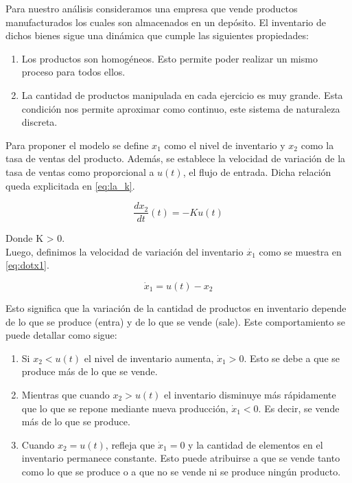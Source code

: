 \documentclass{sig-alternate}
\begin{document}
Para nuestro análisis consideramos una empresa que vende productos manufacturados los cuales son almacenados en un depósito.
El inventario de dichos bienes sigue una dinámica que cumple las siguientes propiedades:
\begin{enumerate}
\item Los productos son homogéneos. Esto permite poder realizar un mismo proceso para todos ellos.
\item La cantidad de productos manipulada en cada ejercicio es muy grande. Esta condición nos permite aproximar como continuo, este sistema de
naturaleza discreta.
\end{enumerate}
Para proponer el modelo se define $x_{1}$ como el nivel
de inventario y $x_{2}$ como la tasa de ventas del producto. Además,
se establece la velocidad de variación de la tasa de ventas como proporcional a $u(t)$, el flujo de entrada. Dicha relación queda explicitada en
\eqref{eq:la_k}.

\begin{equation}
\frac{dx_{2}}{dt}(t)=-Ku(t)\label{eq:la_k}\end{equation}


Donde K > 0.\\
Luego, definimos la velocidad de variación del inventario $\dot{x_{1}}$ como se muestra en \eqref{eq:dotx1}.

\begin{equation}
\dot{x}_{1}=u(t)-x_{2}\label{eq:dotx1}\end{equation}

Esto significa que la variación de la cantidad de productos en inventario depende de lo
que se produce (entra) y de lo que se vende (sale). Este comportamiento se puede detallar como sigue:
\begin{enumerate}
\item Si $x_{2}<u(t)$ el nivel de inventario aumenta, $\dot{x}_{1}>0$.
Esto se debe a que se produce más de lo que se vende.
\item Mientras que cuando $x_{2}>u(t)$ el inventario disminuye más rápidamente que lo que se repone mediante nueva producción, 
$\dot{x}_{1}<0$. Es decir, se vende más de lo que se produce.
\item Cuando $x_{2}=u(t)$, refleja que $\dot{x}_{1}=0$ y la cantidad de
elementos en el inventario permanece constante. Esto puede atribuirse
a que se vende tanto como lo que se produce o a que no se vende ni
se produce ningún producto.
\end{enumerate}
\end{document}
